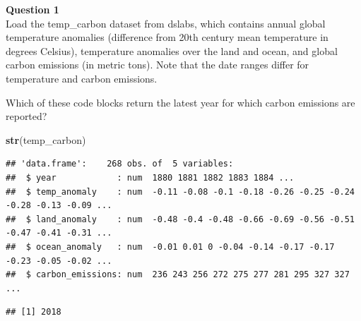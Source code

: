 \documentclass[
]{article}
\newenvironment{Shaded}{\begin{snugshade}}{\end{snugshade}}
\newcommand{\KeywordTok}[1]{\textcolor[rgb]{0.13,0.29,0.53}{\textbf{#1}}}
\newcommand{\NormalTok}[1]{#1}
\newcommand{\OperatorTok}[1]{\textcolor[rgb]{0.81,0.36,0.00}{\textbf{#1}}}
\newcommand{\StringTok}[1]{\textcolor[rgb]{0.31,0.60,0.02}{#1}}
\begin{document}
\textbf{Question 1}\\
Load the temp\_carbon dataset from dslabs, which contains annual global
temperature anomalies (difference from 20th century mean temperature in
degrees Celsius), temperature anomalies over the land and ocean, and
global carbon emissions (in metric tons). Note that the date ranges
differ for temperature and carbon emissions.

Which of these code blocks return the latest year for which carbon
emissions are reported?

\begin{Shaded}
\begin{Highlighting}[]
\KeywordTok{str}\NormalTok{(temp_carbon)}
\end{Highlighting}
\end{Shaded}

\begin{verbatim}
## 'data.frame':    268 obs. of  5 variables:
##  $ year            : num  1880 1881 1882 1883 1884 ...
##  $ temp_anomaly    : num  -0.11 -0.08 -0.1 -0.18 -0.26 -0.25 -0.24 -0.28 -0.13 -0.09 ...
##  $ land_anomaly    : num  -0.48 -0.4 -0.48 -0.66 -0.69 -0.56 -0.51 -0.47 -0.41 -0.31 ...
##  $ ocean_anomaly   : num  -0.01 0.01 0 -0.04 -0.14 -0.17 -0.17 -0.23 -0.05 -0.02 ...
##  $ carbon_emissions: num  236 243 256 272 275 277 281 295 327 327 ...
\end{verbatim}

\begin{Shaded}
\end{Shaded}

\begin{verbatim}
## [1] 2018
\end{verbatim}

\begin{Shaded}
\end{Shaded}
\end{document}
